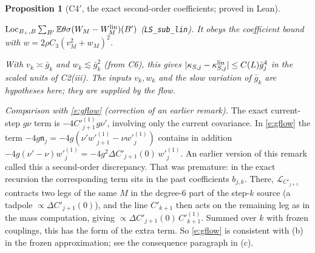 \documentclass[11pt]{amsart}
\newtheorem{proposition}[theorem]{Proposition}
\theoremstyle{definition}
\theoremstyle{remark}
\numberwithin{equation}{section}
\newcommand{\E}{\mathbb{E}}
\newcommand{\cL}{\mathcal{L}}
\newcommand{\Loc}{\operatorname{Loc}}
\begin{document}
\begin{proposition}[C4$'$, the exact second-order coefficients; proved in Lean]
\begin{enumerate}
\begin{itemize}
\begin{itemize}
      $\Loc_{B_+,B}\sum_{B'}\E\theta\sigma(W_M-W^{\rm lin}_M)(B')$ (\texttt{LS\_sub\_lin}).
      It obeys the coefficient bound with $w=2\rho C_3(v_M^2+w_M)^2$.
    \end{itemize}
  \end{itemize}
  With $v_k\asymp\bar g_k$ and $w_k\lesssim\bar g_k^2$ (from C6), this gives
  $|\kappa_{S,j}-\kappa^{\rm lin}_{S,j}|\le C(L)\bar g_j^4$ in the scaled units of C2(iii).
  The inputs $v_k,w_k$ and the slow variation of $\bar g_k$ are hypotheses here; they are supplied
  by the flow.
\end{enumerate}
\end{proposition}

\noindent\emph{Comparison with \eqref{e:gflow} (correction of an earlier remark).} The exact
current-step $g\nu$ term is $-4C'^{(1)}_{j+1}g\nu'$, involving only the current covariance. In
\eqref{e:gflow} the term $-4g\mathfrak n_j=-4g(\nu'w'^{(1)}_{j+1}-\nu w'^{(1)}_j)$ contains in
addition $-4g(\nu'-\nu)w'^{(1)}_j=-4g^2\Delta C'_{j+1}(0)\,w'^{(1)}_j$. An earlier version of this
remark called this a second-order discrepancy. That was premature: in the exact recursion the
corresponding term sits in the past coefficients $b_{j,k}$. There, $\cL_{C'_{j+1}}$ contracts two
legs of the same $M$ in the degree-$6$ part of the step-$k$ source (a tadpole $\propto\Delta C'_{j+1}(0)$),
and the line $C'_{k+1}$ then acts on the remaining leg as in the mass computation, giving
$\propto\Delta C'_{j+1}(0)\,C'^{(1)}_{k+1}$. Summed over $k$ with frozen couplings, this has the form
of the extra term. So \eqref{e:gflow} is consistent with (b) in the frozen approximation; see
the consequence paragraph in (c).
\end{document}
